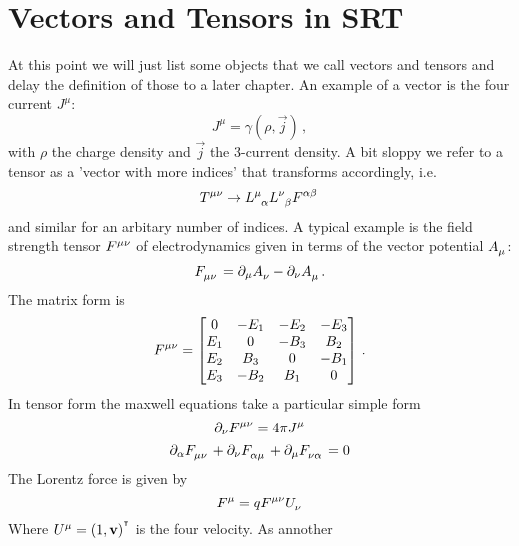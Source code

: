 \section{Vectors and Tensors in SRT}
At this point we will just list some objects that we call vectors and tensors
and delay the definition of those to a later chapter.
An example of a vector is the four current $J^\mu$:
\begin{equation}
    J^\mu=\gamma(\rho,\vec{j})\, ,
\end{equation}
with $\rho$ the charge density and $\vec{j}$ the 3-current density. A bit sloppy
we refer to a tensor as a 'vector with more indices' that transforms
accordingly, i.e.
\begin{equation}
    \tensor{T}{^\mu^\nu}\to
    \tensor{L}{^\mu_\alpha}\tensor{L}{^\nu_\beta}\tensor{F}{^\alpha^\beta}\,
\end{equation}
and similar for an arbitary number of indices. A typical example is the field
strength tensor $\tensor{F}{^\mu^\nu}$ of electrodynamics given in terms of the
vector potential $\tensor{A}{_\mu}$:
\begin{equation}
    \tensor{F}{_\mu_\nu}=\partial_\mu\tensor{A}{_\nu}-\partial_\nu\tensor{A}{_\mu}\,
    .
\end{equation}
The matrix form is
\begin{equation}
    \tensor{F}{^\mu^\nu}=
    \begin{bmatrix}
        0  &   -E_1 &  -E_2 &  -E_3 \\
        E_1 &   0  &  -B_3 & B_2 \\
        E_2 & B_3 &   0  &  -B_1 \\
        E_3 &  -B_2 & B_1 &   0  \\
    \end{bmatrix}\, .
\end{equation}
In tensor form the maxwell equations take a particular simple form
\begin{equation}
    \partial_\nu\tensor{F}{^\mu^\nu}=4\pi\tensor{J}{^\mu}
\end{equation}
\begin{equation}
    \partial_\alpha\tensor{F}{_\mu_\nu}
    +\partial_\nu\tensor{F}{_\alpha_\mu}
    +\partial_\mu\tensor{F}{_\nu_\alpha}=0
\end{equation}
The Lorentz force is given by
\begin{equation}
    \tensor{F}{^\mu}=q\tensor{F}{^\mu^\nu}\tensor{U}{_\nu}
\end{equation}
Where $\tensor{U}{^\mu}=(1,\vec{v})\transpose$ is the four velocity. As annother
